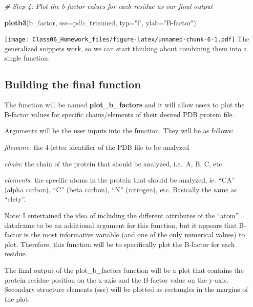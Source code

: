 \documentclass[]{article}
\newenvironment{Shaded}{\begin{snugshade}}{\end{snugshade}}
\newcommand{\KeywordTok}[1]{\textcolor[rgb]{0.13,0.29,0.53}{\textbf{{#1}}}}
\newcommand{\DataTypeTok}[1]{\textcolor[rgb]{0.13,0.29,0.53}{{#1}}}
\newcommand{\StringTok}[1]{\textcolor[rgb]{0.31,0.60,0.02}{{#1}}}
\newcommand{\CommentTok}[1]{\textcolor[rgb]{0.56,0.35,0.01}{\textit{{#1}}}}
\newcommand{\NormalTok}[1]{{#1}}
\begin{document}
\begin{Shaded}
\begin{Highlighting}[]
\CommentTok{# Step 4: Plot the b-factor values for each residue as our final output}

\KeywordTok{plotb3}\NormalTok{(b_factor, }\DataTypeTok{sse=}\NormalTok{pdb_trimmed, }\DataTypeTok{typ=}\StringTok{"l"}\NormalTok{, }\DataTypeTok{ylab=}\StringTok{"B-factor"}\NormalTok{)}
\end{Highlighting}
\end{Shaded}

\texttt{[image: Class06\_Homework\_files/figure-latex/unnamed-chunk-6-1.pdf]}
The generalized snippets work, so we can start thinking about combining
them into a single function.

\subsection{Building the final
function}\label{building-the-final-function}

The function will be named \textbf{plot\_b\_factors} and it will allow
users to plot the B-factor values for specific chains/elements of their
desired PDB protein file.

Arguments will be the user inputs into the function. They will be as
follows:

\emph{filename}: the 4-letter identifier of the PDB file to be analyzed

\emph{chain}: the chain of the protein that should be analyzed, i.e.~A,
B, C, etc.

\emph{elements}: the specific atoms in the protein that should be
analyzed, ie. ``CA'' (alpha carbon), ``C'' (beta carbon), ``N''
(nitrogen), etc. Basically the same as ``elety''.

Note: I entertained the idea of including the different attributes of
the ``atom'' dataframe to be an additional argument for this function,
but it appears that B-factor is the most informative variable (and one
of the only numerical values) to plot. Therefore, this function will be
to specifically plot the B-factor for each residue.

The final output of the plot\_b\_factors function will be a plot that
contains the protein residue position on the x-axis and the B-factor
value on the y-axis. Secondary structure elements (sse) will be plotted
as rectangles in the margins of the plot.
\end{document}
